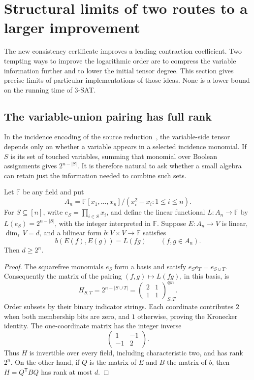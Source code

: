 \section{Structural limits of two routes to a larger improvement}
\label{sec:structure}

The new consistency certificate improves a leading contraction coefficient.
Two tempting ways to improve the logarithmic order are to compress the
variable information further and to lower the initial tensor degree.
This section gives precise limits of particular implementations of those
ideas. None is a lower bound on the running time of 3-SAT.

\subsection{The variable-union pairing has full rank}

In the incidence encoding of the source reduction~\cite{openai}, the
variable-side tensor depends only on whether a variable appears in a selected
incidence monomial. If $S$ is its set of touched variables, summing that
monomial over Boolean assignments gives $2^{n-|S|}$. It is therefore natural
to ask whether a small algebra can retain just the information needed to
combine such sets.

\begin{theorem}
\label{thm:union-rank}
Let $\mathbb F$ be any field and put
\[
 A_n=\mathbb F[x_1,\ldots,x_n]/(x_i^2-x_i:1\le i\le n).
\]
For $S\subseteq[n]$, write $e_S=\prod_{i\in S}x_i$, and define the
linear functional $L:A_n\to\mathbb F$ by $L(e_S)=2^{n-|S|}$, with
the integer interpreted in $\mathbb F$.
Suppose $E:A_n\to V$ is linear, $\dim_{\mathbb F}V=d$, and a bilinear
form $b:V\times V\to\mathbb F$ satisfies
\[
 b(E(f),E(g))=L(fg)\qquad(f,g\in A_n).
\]
Then $d\ge2^n$.
\end{theorem}

\begin{proof}
The squarefree monomials $e_S$ form a basis and satisfy
$e_Se_T=e_{S\cup T}$. Consequently the matrix of the pairing
$(f,g)\mapsto L(fg)$, in this basis, is
\[
 H_{S,T}=2^{n-|S\cup T|}
 =\left(\begin{array}{cc}2&1\\1&1\end{array}\right)^{\otimes n}_{S,T}.
 \tag{U}
\]
Order subsets by their binary indicator strings. Each coordinate contributes
$2$ when both membership bits are zero, and $1$ otherwise, proving the
Kronecker identity. The one-coordinate matrix has the integer inverse
\[
 \left(\begin{array}{rr}1&-1\\-1&2\end{array}\right).
\]
Thus $H$ is invertible over every field, including characteristic two, and
has rank $2^n$. On the other hand, if $Q$ is the matrix of $E$ and $B$
the matrix of $b$, then $H=Q^{\mathsf T}BQ$ has rank at most $d$.
\end{proof}

